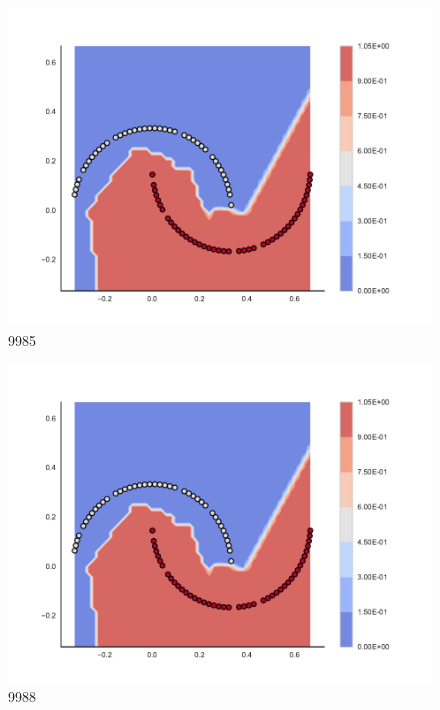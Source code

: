\begin{subfigure}[b]{0.09\textwidth}
    \includegraphics[clip, trim=2.35cm 1.75cm 4.5cm 0cm,width=\textwidth]{img/convergence/9985.pdf}
    \caption{9985}
    \label{fig:convergence_9985}
\end{subfigure}
%
\begin{subfigure}[b]{0.09\textwidth}
    \includegraphics[clip, trim=2.35cm 1.75cm 4.5cm 0cm,width=\textwidth]{img/convergence/9988.pdf}
    \caption{9988}
    \label{fig:convergence_9988}
\end{subfigure}
%
